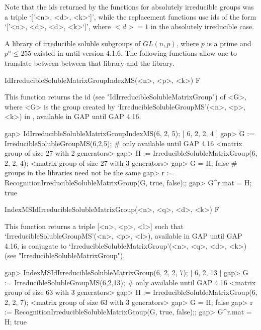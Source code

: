 Note that the ids returned by the functions for absolutely irreducible groups was a triple `['<n>, <d>, <k>`]', while the replacement functions use ids of the form `['<n>, <d>, <d>, <k>`]', where $<d> = 1$ in the absolutely irreducible case.


\null


A library of irreducible soluble subgroups of $GL(n, p)$, where $p$ is a 
prime and $p^n \leq 255$ existed in {\GAP} until version 4.1.6. The following functions
allow one to translate between between that library and the {\IRREDSOL} library. 

\>IdIrreducibleSolubleMatrixGroupIndexMS(<n>, <p>, <k>) F

This function returns the {\IRREDSOL} id (see "IdIrreducibleSolubleMatrixGroup") of <G>, 
where <G> is the group created by `IrreducibleSolubleGroupMS'(<n>, <p>, <k>) in {\GAP}, available in GAP until GAP 4.16.

\testexamplefalse
\beginexample
gap> IdIrreducibleSolubleMatrixGroupIndexMS(6, 2, 5);
[ 6, 2, 2, 4 ]
gap> G := IrreducibleSolubleGroupMS(6,2,5); # only available until GAP 4.16
<matrix group of size 27 with 2 generators>
gap> H := IrreducibleSolubleMatrixGroup(6, 2, 2, 4);
<matrix group of size 27 with 3 generators>
gap> G = H;
false 
# groups in the libraries need not be the same
gap> r := RecognitionIrreducibleSolubleMatrixGroup(G, true, false);;
gap> G^r.mat = H;
true
\endexample

\>IndexMSIdIrreducibleSolubleMatrixGroup(<n>, <q>, <d>, <k>) F

This function returns a triple [<n>, <p>, <l>] such that
`IrreducibleSolubleGroupMS'(<n>, <p>, <l>), available in GAP until GAP 4.16,  is conjugate to
`IrreducibleSolubleMatrixGroup'(<n>, <q>, <d>, <k>) (see "IrreducibleSolubleMatrixGroup").

\testexamplefalse
\beginexample
gap> IndexMSIdIrreducibleSolubleMatrixGroup(6, 2, 2, 7);
[ 6, 2, 13 ]
gap> G := IrreducibleSolubleGroupMS(6,2,13); # only available until GAP 4.16
<matrix group of size 63 with 3 generators>
gap> H := IrreducibleSolubleMatrixGroup(6, 2, 2, 7);
<matrix group of size 63 with 3 generators>
gap> G = H;
false 
gap> r := RecognitionIrreducibleSolubleMatrixGroup(G, true, false);;
gap> G^r.mat = H;
true
\endexample


\null

